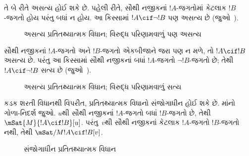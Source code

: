 \documentclass[../../../include/open-logic-section]{subfiles}
\begin{document}
તે બે રીતે અસત્ય હોઈ શકે છે. પહેલી રીતે, સૌથી નજીકનાં $!A$-જગતોમાં
કેટલાક $!B$-જગતો હોય પરંતુ બધાં ન હોય. આ કિસ્સામાં
$!A \cif \lnot !B$ પણ અસત્ય છે (જુઓ~).
\begin{figure}
\begin{center}
\caption{અસત્ય પ્રતિતથ્યાત્મક વિધાન; વિરુદ્ધ પરિણામવાળું પણ અસત્ય}
\end{center}
\end{figure}
સૌથી નજીકનાં $!A$-જગતો અને $!B$-જગતો એકબીજાને જરા પણ ન મળે,
તો $!A \cif !B$ અસત્ય છે. પરંતુ આ કિસ્સામાં સૌથી નજીકનાં બધાં
$!A$-જગતો $\lnot !B$-જગતો છે; તેથી $!A \cif \lnot !B$ સત્ય છે
(જુઓ~).
\begin{figure}
\begin{center}
\caption{અસત્ય પ્રતિતથ્યાત્મક વિધાન; વિરુદ્ધ પરિણામવાળું સત્ય}
\end{center}
\end{figure}

કડક શરતી વિધાનથી વિપરીત, પ્રતિતથ્યાત્મક વિધાનો સંજોગાધીન હોઈ શકે
છે. માંનો ગોળા-નિદર્શ જુઓ. $u$થી સૌથી નજીકનાં
$!A$-જગતો બધાં $!B$-જગતો છે, તેથી $\mSat{M}{!A \cif
  !B}[u]$. પરંતુ~$v$થી સૌથી નજીકનાં કેટલાક $!A$-જગતો $!B$-જગતો
નથી, તેથી $\mSat/{M}{!A \cif !B}[v]$.
\begin{figure}
\begin{center}
\end{center}
\caption{સંજોગાધીન પ્રતિતથ્યાત્મક વિધાન}
\end{figure}
\end{document}
